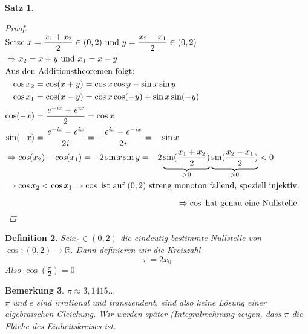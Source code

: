 \documentclass[a4paper,titlepage,oneside]{article}
\def\R{\ensuremath{\mathbb{R}} }
\def\im{\ensuremath{\mathit{i}} }
\def\e{\ensuremath{\mathit{e}} }
\theoremstyle{thmstyle}
\newtheorem{satz}{Satz}[section]
\newtheorem{defi}[satz]{Definition}
\newtheorem{bem}[satz]{Bemerkung}
\theoremstyle{subthmstyle}
\begin{document}
\begin{satz}
\begin{proof}
\begin{math}
\begin{aligned}[t]
\begin{aligned}[t]
&\text{Setze } x = \frac{x_1 + x_2}{2} \in (0,2)\text{ und }y = \frac{x_2 - x_1}{2} \in (0,2) \\
&\Rightarrow x_2 = x + y\text{ und }x_1 = x - y \\
&\text{Aus den Additionstheoremen folgt: }\\
&\begin{aligned}[t]\cos x_2 &= \cos (x + y) = \cos x \cos y - \sin x \sin y \\ 
\cos x_1 &= \cos (x - y) = \cos x \cos(-y) + \sin x \sin (-y) \\
 \cos(-x) &= \frac{\e^{-\im x} + \e^{\im x}}{2} = \cos x \\
 \sin(-x) &= \frac{\e^{-\im x} - \e^{\im x}}{2\im}  = -\frac{\e^{\im x} - \e^{-\im x}}{2\im}= - \sin x\end{aligned}\\
&\Rightarrow \cos(x_2) - \cos(x_1) = - 2\sin x \sin y = - 2 \underbrace{\sin(\frac{x_1 + x_2}{2})}_{> 0}  \underbrace{\sin(\frac{x_2 - x_1}{2})}_{> 0} < 0 \\
&\Rightarrow \cos x_2 < \cos x_1 \Rightarrow \cos \text{ ist auf $(0,2)$ streng monoton fallend, speziell injektiv.}\end{aligned}\\
\vphantom{\frac{1}{2}}\Rightarrow \cos \text{ hat genau eine Nullstelle.}\end{aligned}\\
\end{math}
\end{proof}
\end{satz}

\begin{defi}
Sei$x_0 \in (0,2)$ die eindeutig bestimmte Nullstelle von $\cos : (0,2) \to \R$. Dann definieren wir die Kreiszahl \[ \pi = 2 x_0 \]
Also $\displaystyle \cos (\frac{\pi}{2}) = 0$
\end{defi}

\begin{bem}
$\pi \approx 3,1415\dots $\\
$\pi$ und \e sind irrational und transzendent, sind also keine Lösung einer algebraischen Gleichung. Wir werden später (Integralrechnung zeigen, dass $\pi$ die Fläche des Einheitskreises ist.
\end{bem}
\end{document}
